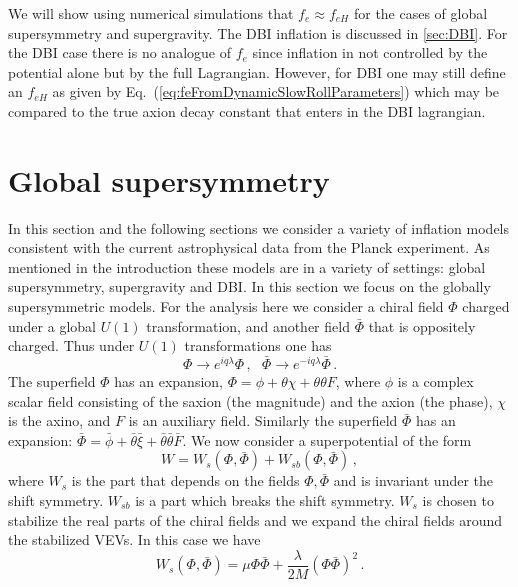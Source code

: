 \documentclass[11pt]{article}
\begin{document}
We will show using numerical simulations that $f_e \approx f_{eH}$ for the cases of global supersymmetry and supergravity.
The DBI inflation is discussed in \ref{sec:DBI}.
For the DBI case there is no analogue of $f_e$ since inflation in not controlled by the potential alone but by the full Lagrangian.
However, for DBI one may still define an $f_{eH}$ as given by Eq.~(\ref{eq:feFromDynamicSlowRollParameters}) which may be compared to the true axion decay constant that enters in the DBI lagrangian.

\section{Global supersymmetry \label{sec:Supersymmetry}}
In this section and the following sections we consider a variety of inflation models consistent with the current astrophysical data from the Planck experiment.
As mentioned in the introduction these models are in a variety of settings: global supersymmetry, supergravity and DBI.
In this section we focus on the globally supersymmetric models.
For the analysis here we consider a chiral field $\Phi$ charged under a global $U\left(1\right)$ transformation, and another field $\bar\Phi$ that is oppositely charged.
Thus under $U\left(1\right)$ transformations one has
\begin{equation}
  \Phi \to e^{i q \lambda} \Phi\,,
  ~~~ \bar\Phi \to e^{-i q \lambda} \bar\Phi\,.
\end{equation}
The superfield $\Phi$ has an expansion, $\Phi = \phi + \theta \chi + \theta \theta F$, where $\phi$ is a complex scalar field consisting of the saxion (the magnitude) and the axion (the phase), $\chi$ is the axino, and $F$ is an auxiliary field.
Similarly the superfield $\bar\Phi$ has an expansion: $\bar\Phi = \bar\phi + \bar\theta \bar\xi + \bar\theta \bar\theta \bar F$.
We now consider a superpotential of the form
\begin{equation} \label{eq:supersymmetry:W}
  W = W_s\left(\Phi, \bar\Phi\right) + W_{sb}\left(\Phi, \bar\Phi\right)\,,
\end{equation}
where $W_s$ is the part that depends on the fields $\Phi, \bar\Phi$ and is invariant under the shift symmetry.
$W_{sb}$ is a part which breaks the shift symmetry.
$W_s$ is chosen to stabilize the real parts of the chiral fields and we expand the chiral fields around the stabilized VEVs.
In this case we have
\begin{equation}
  W_s\left(\Phi, \bar\Phi\right) =
    \mu \Phi \bar\Phi + \frac{\lambda}{2 M} \left(\Phi \bar\Phi\right)^2\,.
\end{equation}
\end{document}

